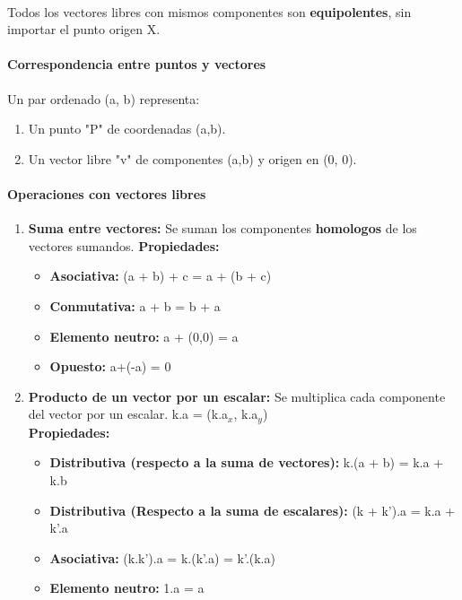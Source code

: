 \documentclass[11pt]{article}
\begin{document}
\paragraph{}
Todos los vectores libres con mismos componentes son \textbf{equipolentes}, sin importar el punto origen X.

\paragraph{Correspondencia entre puntos y vectores}
Un par ordenado (a, b) representa:
\begin{enumerate}
	\item Un punto "P" de coordenadas (a,b).
	\item Un vector libre "v" de componentes (a,b) y origen en (0, 0).
\end{enumerate}

\paragraph{Operaciones con vectores libres}
\begin{enumerate}
	\item \textbf{Suma entre vectores:} Se suman los componentes \textbf{homologos} de los vectores sumandos.
	\textbf{Propiedades:}
	\begin{itemize}
		\item \textbf{Asociativa: } (a + b) + c = a + (b + c)
		\item \textbf{Conmutativa: } a + b = b + a
		\item \textbf{Elemento neutro: } a + (0,0) = a
		\item \textbf{Opuesto: } a+(-a) = 0 
	\end{itemize}
	\item \textbf{Producto de un vector por un escalar:} Se multiplica cada componente del vector por un escalar. k.a = (k.a$_x		$, k.a$_y$)\\
	\textbf{Propiedades:}
	\begin{itemize}
		\item \textbf{Distributiva (respecto a la suma de vectores): } k.(a + b) = k.a + k.b 
		\item \textbf{Distributiva (Respecto a la suma de escalares): } (k + k').a = k.a + k'.a
		\item \textbf{Asociativa: } (k.k').a = k.(k'.a) = k'.(k.a)
		\item \textbf{Elemento neutro: } 1.a = a
	\end{itemize}
\end{enumerate}
\end{document}
